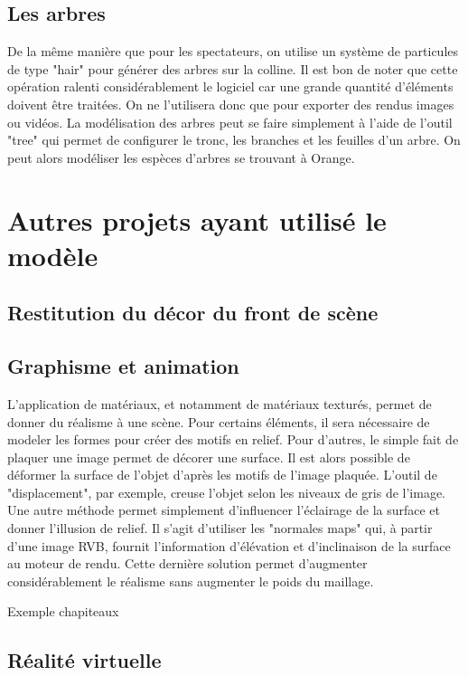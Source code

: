 \subsection{Les arbres}
De la même manière que pour les spectateurs, on utilise un système de \glspl{particule} de type "hair" pour générer des arbres sur la colline. Il est bon de noter que cette opération ralenti considérablement le logiciel car une grande quantité d'éléments doivent être traitées. On ne l'utilisera donc que pour exporter des rendus images ou vidéos. La modélisation des arbres peut se faire simplement à l'aide de l'outil "tree" qui permet de configurer le tronc, les branches et les feuilles d'un arbre. On peut alors modéliser les espèces d'arbres se trouvant à Orange.


\section{Autres projets ayant utilisé le modèle}
\label{sect-autres}

\subsection{Restitution du décor du front de scène}

\subsection{Graphisme et animation}
L'application de matériaux, et notamment de matériaux texturés, permet de donner du réalisme à une scène. Pour certains éléments, il sera nécessaire de modeler les formes pour créer des motifs en relief. Pour d'autres, le simple fait de plaquer une image permet de décorer une surface. Il est alors possible de déformer la surface de l'objet d'après les motifs de l'image plaquée. L'outil de "displacement", par exemple, creuse l'objet selon les niveaux de gris de l'image. Une autre méthode permet simplement d'influencer l'éclairage de la surface et donner l'illusion de relief. Il s'agit d'utiliser les "normales maps" qui, à partir d'une image \gls{RVB}, fournit l'information d'élévation et d'inclinaison de la surface au moteur de rendu. Cette dernière solution permet d'augmenter considérablement le réalisme sans augmenter le poids du maillage.

Exemple chapiteaux

\subsection{Réalité virtuelle}
		
